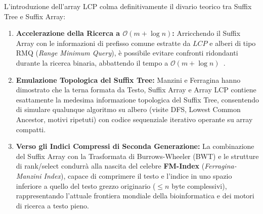 L'introduzione dell'array LCP colma definitivamente il divario teorico tra Suffix Tree e Suffix Array:
\begin{enumerate}
  \item \textbf{Accelerazione della Ricerca a $\mathcal{O}(m + \log n)$:} Arricchendo il Suffix Array con le informazioni di prefisso comune estratte da $LCP$ e alberi di tipo RMQ (\textit{Range Minimum Query}), \`e possibile evitare confronti ridondanti durante la ricerca binaria, abbattendo il tempo a $\mathcal{O}(m + \log n)$~\cite{manber1993}.
  \item \textbf{Emulazione Topologica del Suffix Tree:} Manzini e Ferragina hanno dimostrato che la terna formata da Testo, Suffix Array e Array LCP contiene esattamente la medesima informazione topologica del Suffix Tree, consentendo di simulare qualunque algoritmo su albero (visite DFS, Lowest Common Ancestor, motivi ripetuti) con codice sequenziale iterativo operante su array compatti.
  \item \textbf{Verso gli Indici Compressi di Seconda Generazione:} La combinazione del Suffix Array con la Trasformata di Burrows-Wheeler (BWT) e le strutture di rank/select condurr\`a alla nascita del celebre \textbf{FM-Index} (\textit{Ferragina-Manzini Index}), capace di comprimere il testo e l'indice in uno spazio inferiore a quello del testo grezzo originario ($\le n$ byte complessivi), rappresentando l'attuale frontiera mondiale della bioinformatica e dei motori di ricerca a testo pieno.
\end{enumerate}